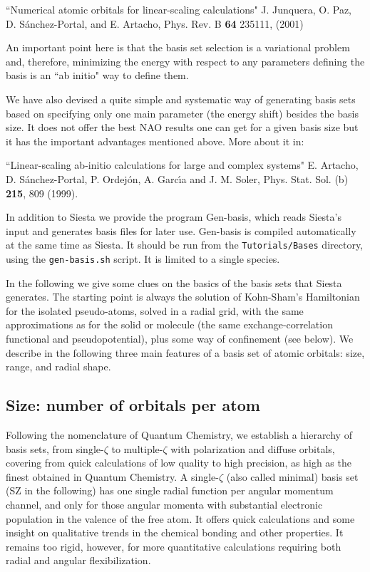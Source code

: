 \documentclass[11pt]{article}
\begin{document}
\noindent
``Numerical atomic orbitals for linear-scaling calculations"
J. Junquera, O. Paz, D. S\'anchez-Portal, and E. Artacho, Phys. Rev. B
{\bf 64} 235111, (2001)

An important point here is that the basis set selection is a 
variational problem and, therefore, minimizing the energy with respect
to any parameters defining the basis is an ``ab initio" way to 
define them.

We have also devised a quite simple and systematic way of generating 
basis sets based on specifying only one main parameter (the energy shift)
besides the basis size. It does not offer the best NAO results one can get 
for a given basis size but it has the important advantages mentioned above. 
More about it in:

\noindent
``Linear-scaling ab-initio calculations for large and complex systems"
E. Artacho, D. S\'anchez-Portal, P. Ordej\'on, A. Garc\'{\i}a and
J. M. Soler, Phys. Stat. Sol. (b) {\bf 215}, 809 (1999).

In addition to {\sc Siesta} we provide the program {\sc
Gen-basis}, which reads {\sc
Siesta}'s input and generates basis files for later use. {\sc
Gen-basis} is compiled automatically at the same time as {\sc
Siesta}. It should be run from the {\tt Tutorials/Bases} directory, 
using the {\tt gen-basis.sh} script. It is limited to a single species.

In the following we give some clues on the basics of the basis sets
that {\sc Siesta} generates. 
  The starting point is always the solution of Kohn-Sham's Hamiltonian
for the isolated pseudo-atoms, solved in a radial grid,
with the same approximations as for the solid or molecule 
(the same exchange-correlation functional and  pseudopotential),
plus some way of confinement (see below).
  We describe in the following three main features of a
basis set of atomic orbitals: size, range, and radial shape.

\subsection{Size: number of orbitals per atom}

  Following the nomenclature of Quantum Chemistry, we establish
a hierarchy of basis sets, from single-$\zeta$ to multiple-$\zeta$ 
with polarization and diffuse orbitals, covering from quick calculations
of low quality to high precision, as high as the finest obtained in
Quantum Chemistry. 
  A single-$\zeta$ (also called minimal) basis set (SZ in the following)
has one single radial function per angular momentum channel, and only for 
those angular momenta with substantial electronic population in the valence of
the free atom.
  It offers quick calculations and some insight on qualitative trends 
in the chemical bonding and other properties. 
  It remains too rigid, however, for more quantitative calculations
requiring both radial and angular flexibilization.
\end{document}
